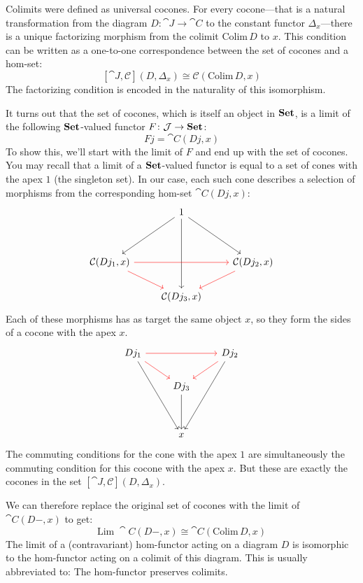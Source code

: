 \documentclass[DaoFP]{subfiles}
\begin{document}
Colimits were defined as universal cocones. For every cocone---that is a natural transformation from the diagram $D \colon \cat J \to \cat C$ to the constant functor $\Delta_x$---there is a unique factorizing morphism from the colimit $\text{Colim}\, D$ to $x$. This condition can be written as a one-to-one correspondence between the set of cocones and a hom-set:
\[ [\cat J, \mathcal{C}](D, \Delta_x)  \cong \mathcal{C}( \text{Colim} \, D, x) \]
The factorizing condition is encoded in the naturality of this isomorphism.

It turns out that the set of cocones, which is itself an object in $\mathbf{Set}$, is a limit of the following $\mathbf{Set}$-valued functor $F \colon \mathcal{J} \to \mathbf{Set}$:
\[ F j = \cat C(D j, x) \]
To show this, we'll start with the limit of $F$ and end up with the set of cocones. You may recall that a limit of a $\mathbf{Set}$-valued functor is equal to a set of cones with the apex $1$ (the singleton set). In our case, each such cone describes a selection of morphisms from the corresponding hom-set $\cat C(D j, x)$:
\[
 \begin{tikzcd}
  & 1
\arrow[ddr, ""]
 \arrow[ddl, ""']
 \arrow[ddd, ""]
 \\
\\
\cat C( D j_1, x)
\arrow[rr, red]
\arrow[rd, red]
&& \cat C( D j_2, x)
\arrow[dl, red]
\\
& \cat C( D j_3, x)
 \end{tikzcd}
\]
Each of these morphisms has as target the same object $x$, so they form the sides of a cocone with the apex $x$. 
\[
\begin{tikzcd}
 D j_1
 \arrow[rr, red]
 \arrow[dr, red]
 \arrow[dddr, ""']
 && D j_2
\arrow[dl, red]
 \arrow[dddl, ""]
 \\
 & D j_3
 \arrow[dd, ""]
 \\
 \\
 & x
 \end{tikzcd}
 \]
The commuting conditions for the cone with the apex $1$ are simultaneously the commuting condition for this cocone with the apex $x$. But these are exactly the cocones in the set $ [\cat J, \mathcal{C}](D, \Delta_x)$.

We can therefore replace the original set of cocones with the limit of $\cat C (D-, x)$ to get:
\[ \text{Lim}\; \cat C (D-, x) \cong \cat C( \text{Colim}\,  D, x) \]
The limit of a (contravariant) hom-functor acting on a diagram $D$ is isomorphic to the hom-functor acting on a colimit of this diagram. This is usually abbreviated to: The hom-functor preserves colimits. 
\end{document}
